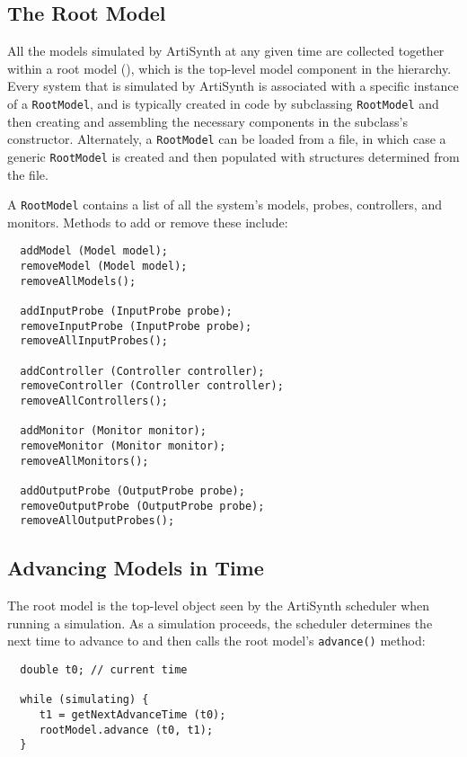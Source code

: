 \documentclass{article}
\begin{document}
\subsection{The Root Model}
\label{RootModelSec}

All the models simulated by ArtiSynth at any given time are collected
together within a root model (), which is the
top-level model component in the hierarchy. Every system that is
simulated by ArtiSynth is associated with a specific instance of a
{\tt RootModel}, and is typically created in code by subclassing
{\tt RootModel} and then creating and assembling the necessary components
in the subclass's constructor. Alternately, a {\tt RootModel} can be
loaded from a file, in which case a generic {\tt RootModel} is created and
then populated with structures determined from the file.

A {\tt RootModel} contains a list of all the system's models, probes,
controllers, and monitors. Methods to add or remove these include:

\begin{lstlisting}
  addModel (Model model);
  removeModel (Model model);
  removeAllModels();

  addInputProbe (InputProbe probe);
  removeInputProbe (InputProbe probe);
  removeAllInputProbes();

  addController (Controller controller);
  removeController (Controller controller);
  removeAllControllers();

  addMonitor (Monitor monitor);
  removeMonitor (Monitor monitor);
  removeAllMonitors();

  addOutputProbe (OutputProbe probe);
  removeOutputProbe (OutputProbe probe);
  removeAllOutputProbes();
\end{lstlisting}

\subsection{Advancing Models in Time}

The root model is the top-level object seen by the ArtiSynth scheduler
when running a simulation. As a simulation proceeds, the scheduler determines
the next time to advance to and then calls the root model's {\tt advance()}
method:
\begin{lstlisting}
  double t0; // current time

  while (simulating) {
     t1 = getNextAdvanceTime (t0);
     rootModel.advance (t0, t1);
  }
\end{lstlisting}
\end{document}
